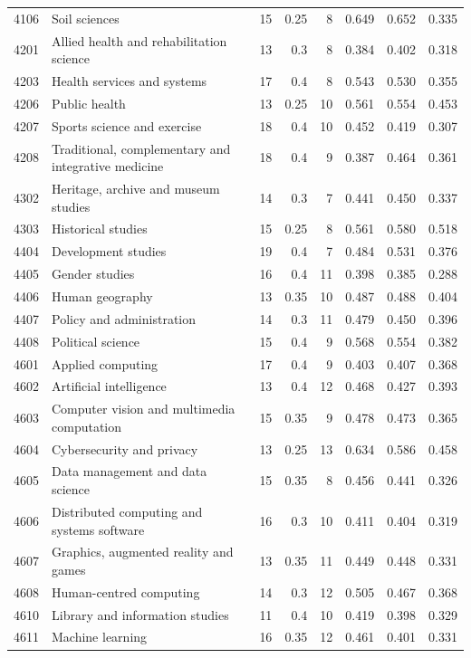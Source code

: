 \begin{longtable}{r p{3.35cm} rr r rrr}
4106 & Soil sciences & 15 & 0.25 & 8 & 0.649 & 0.652 & 0.335 \\
4201 & Allied health and rehabilitation science & 13 & 0.3 & 8 & 0.384 & 0.402 & 0.318 \\
4203 & Health services and systems & 17 & 0.4 & 8 & 0.543 & 0.530 & 0.355 \\
4206 & Public health & 13 & 0.25 & 10 & 0.561 & 0.554 & 0.453 \\
4207 & Sports science and exercise & 18 & 0.4 & 10 & 0.452 & 0.419 & 0.307 \\
4208 & Traditional, complementary and integrative medicine & 18 & 0.4 & 9 & 0.387 & 0.464 & 0.361 \\
4302 & Heritage, archive and museum studies & 14 & 0.3 & 7 & 0.441 & 0.450 & 0.337 \\
4303 & Historical studies & 15 & 0.25 & 8 & 0.561 & 0.580 & 0.518 \\
4404 & Development studies & 19 & 0.4 & 7 & 0.484 & 0.531 & 0.376 \\
4405 & Gender studies & 16 & 0.4 & 11 & 0.398 & 0.385 & 0.288 \\
4406 & Human geography & 13 & 0.35 & 10 & 0.487 & 0.488 & 0.404 \\
4407 & Policy and administration & 14 & 0.3 & 11 & 0.479 & 0.450 & 0.396 \\
4408 & Political science & 15 & 0.4 & 9 & 0.568 & 0.554 & 0.382 \\
4601 & Applied computing & 17 & 0.4 & 9 & 0.403 & 0.407 & 0.368 \\
4602 & Artificial intelligence & 13 & 0.4 & 12 & 0.468 & 0.427 & 0.393 \\
4603 & Computer vision and multimedia computation & 15 & 0.35 & 9 & 0.478 & 0.473 & 0.365 \\
4604 & Cybersecurity and privacy & 13 & 0.25 & 13 & 0.634 & 0.586 & 0.458 \\
4605 & Data management and data science & 15 & 0.35 & 8 & 0.456 & 0.441 & 0.326 \\
4606 & Distributed computing and systems software & 16 & 0.3 & 10 & 0.411 & 0.404 & 0.319 \\
4607 & Graphics, augmented reality and games & 13 & 0.35 & 11 & 0.449 & 0.448 & 0.331 \\
4608 & Human-centred computing & 14 & 0.3 & 12 & 0.505 & 0.467 & 0.368 \\
4610 & Library and information studies & 11 & 0.4 & 10 & 0.419 & 0.398 & 0.329 \\
4611 & Machine learning & 16 & 0.35 & 12 & 0.461 & 0.401 & 0.331 \\

\end{longtable}
